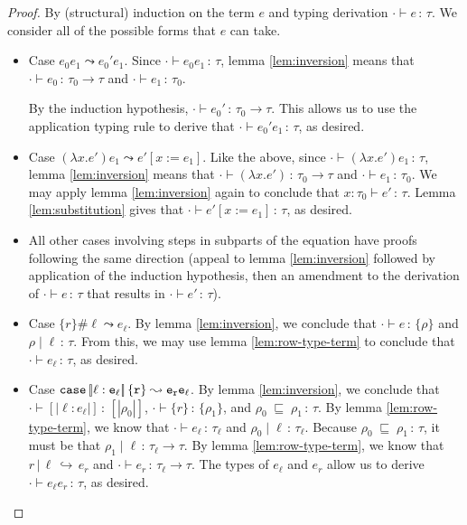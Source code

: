 \documentclass{article}
\newcommand{\variant}[1]{[\!|#1|\!]}
\newcommand{\case}[2]{\tt{case}\,#1\,#2}
\newcommand{\hastp}[3]{#1 \vdash #2 \,:\, #3}
\newcommand{\haslbl}[3]{#1\;|\;#2\,:\, #3}
\newcommand{\caseVarRcd}[3]{#1 \;\sqsubseteq\; #2 \,:\, #3}
\newcommand{\haslbltm}[3]{#1\,|\,#2\,\hookrightarrow\, #3}
\newcommand{\step}[2]{#1 \leadsto #2}
\begin{document}
\begin{proof}
  By (structural) induction on the term $e$ and typing derivation \(\hastp \cdot
  e \tau\). We consider all of the possible forms that \(e\) can take.

\begin{itemize}
  \item Case \(\step {e_0 e_1} {e_0' e_1}\). Since \(\hastp \cdot {e_0 e_1}
    \tau\), lemma \ref{lem:inversion} means that \(\hastp \cdot {e_0} {\tau_0
      \to \tau}\) and \(\hastp \cdot {e_1} {\tau_0}\).

    By the induction hypothesis, \(\hastp \cdot {e_0'} {\tau_0 \to \tau}\). This
    allows us to use the application typing rule to derive that \(\hastp \cdot
    {e_0' e_1} \tau\), as desired.
  \item Case \(\step {(\lambda x. e')e_1} {e'[x:=e_1]}\). Like the above, since
    \(\hastp \cdot {(\lambda x.e') e_1} \tau\), lemma \ref{lem:inversion} means
    that \(\hastp \cdot {(\lambda x.e')} {\tau_0 \to \tau}\) and \(\hastp \cdot
    {e_1} {\tau_0}\). We may apply lemma \ref{lem:inversion} again to conclude
    that \(\hastp {x : \tau_0} {e'} \tau\). Lemma \ref{lem:substitution} gives
    that \(\hastp \cdot {e'[x:=e_1]} \tau\), as desired.
  \item All other cases involving steps in subparts of the equation have proofs
    following the same direction (appeal to lemma \ref{lem:inversion} followed
    by application of the induction hypothesis, then an amendment to the
    derivation of \(\hastp \cdot e \tau\) that results in \(\hastp \cdot {e'}
    \tau\)).
  \item Case \(\step {\{r\} \# \ell} {e_\ell}\). By lemma \ref{lem:inversion},
    we conclude that \(\hastp \cdot e {\{\rho\}}\) and \(\haslbl \rho \ell
    \tau\). From this, we may use lemma \ref{lem:row-type-term} to conclude that
    \(\hastp \cdot {e_\ell} \tau\), as desired.
  \item Case \(\step {\case {\variant {\ell : e_\ell}} {\{r\}}} {e_r e_\ell}\).
    By lemma \ref{lem:inversion}, we conclude that \(\hastp \cdot {\variant
      {\ell : e_\ell}} {\variant {\rho_0}}\), \(\hastp \cdot {\{r\}}
    {\{\rho_1\}}\), and \(\caseVarRcd {\rho_0} {\rho_1} \tau\). By lemma
    \ref{lem:row-type-term}, we know that \(\hastp \cdot {e_\ell} {\tau_\ell}\)
    and \(\haslbl {\rho_0} \ell {\tau_\ell}\). Because \(\caseVarRcd {\rho_0}
    {\rho_1} \tau\), it must be that \(\haslbl {\rho_1} \ell {\tau_\ell \to
      \tau}\). By lemma \ref{lem:row-type-term}, we know that \(\haslbltm r \ell
    {e_r}\) and \(\hastp \cdot {e_r} {\tau_\ell \to \tau}\). The types of
    \(e_\ell\) and \(e_r\) allow us to derive \(\hastp \cdot {e_\ell e_r}
    \tau\), as desired.
\end{itemize}

\end{proof}
\end{document}
